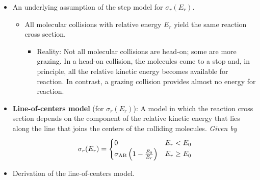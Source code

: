 \documentclass[../notes.tex]{subfiles}
\begin{document}
\begin{itemize}
    \item {}An underlying assumption of the step model for $\sigma_r(E_r)$.
    \begin{itemize}
        \item All molecular collisions with relative energy $E_r$ yield the same reaction cross section.
        \begin{itemize}
            \item Reality: Not all molecular collisions are head-on; some are more grazing. In a head-on collision, the molecules come to a stop and, in principle, all the relative kinetic energy becomes available for reaction. In contrast, a grazing collision provides almost no energy for reaction.
        \end{itemize}
    \end{itemize}
    \item \textbf{Line-of-centers model} (for $\sigma_r(E_r)$): A model in which the reaction cross section depends on the component of the relative kinetic energy that lies along the line that joins the centers of the colliding molecules. \emph{Given by}
    \begin{equation*}
        \sigma_r(E_r) =
        \begin{cases}
            0 & E_r<E_0\\
            \sigma_{\ce{A}\ce{B}}\left( 1-\frac{E_0}{E_r} \right) & E_r\geq E_0
        \end{cases}
    \end{equation*}
    \item Derivation of the line-of-centers model.
    \begin{figure}[h!]
        \centering
\end{figure}
\end{itemize}
\end{document}

